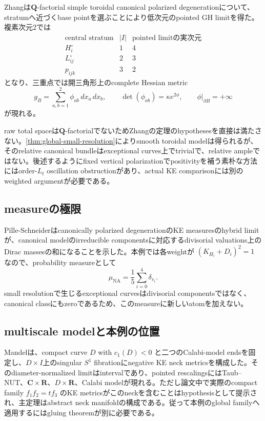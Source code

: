 \documentclass[11pt,a4paper]{ltjsarticle}
\theoremstyle{definition}
\theoremstyle{remark}
\newcommand{\CC}{\mathbf C}
\newcommand{\RR}{\mathbf R}
\begin{document}
Zhangは$\mathbf Q$-factorial simple toroidal canonical polarized degenerationについて、stratumへ近づくbase pointを選ぶことにより低次元のpointed GH limitを得た\cite{Zhang}。複素次元2では
\[
 \begin{array}{c|c|c}
 \text{central stratum}&|I|&\text{pointed limitの実次元}\\
 \hline
 H_i^\circ&1&4\\
 L_{ij}^\circ&2&3\\
 p_{ijk}&3&2
 \end{array}
\]
となり、三重点では開三角形上のcomplete Hessian metric
\begin{equation}\label{eq:CYsimplex}
 g_B=\sum_{a,b=1}^2\phi_{ab}\,dx_a\,dx_b,
 \qquad
 \det(\phi_{ab})=\kappa e^{2\phi},
 \qquad \phi|_{\partial B}=+\infty
\end{equation}
が現れる。

raw total spaceは$\mathbf Q$-factorialでないためZhangの定理のhypothesesを直接は満たさない。\cref{thm:global-small-resolution}によりsmooth toroidal modelは得られるが、そのrelative canonical bundleはexceptional curves上でtrivialで、relative ampleではない。後述するようにfixed vertical polarizationでpositivityを補う素朴な方法にはorder-$L_t$ oscillation obstructionがあり、actual KE comparisonには別のweighted argumentが必要である。

\subsection{measureの極限}

Pille-Schneiderはcanonically polarized degenerationのKE measuresのhybrid limitが、canonical modelのirreducible componentsに対応するdivisorial valuations上のDirac massesの和になることを示した\cite{PilleSchneider}。本例では各weightが $(K_{H_i}+D_i)^2=1$ なので、probability measureとして
\begin{equation}\label{eq:measurelimit}
 \mu_{\mathrm{NA}}=\frac15\sum_{i=0}^4\delta_{v_i}.
\end{equation}
small resolutionで生じるexceptional curvesはdivisorial componentsではなく、canonical classにもzeroであるため、このmeasureに新しいatomを加えない。

\subsection{multiscale modelと本例の位置}

Mandelは、compact curve $D$ with $c_1(D)<0$ と二つのCalabi-model endsを固定し、$D\times I$上のsingular $S^1$ fibrationにnegative KE neck metricsを構成した\cite{Mandel}。そのdiameter-normalized limitはintervalであり、pointed rescalingsにはTaub--NUT、$\CC\times\RR$、$D\times\RR$、Calabi modelが現れる。ただし論文中で実際のcompact family
$f_1f_2=tf_3$ のKE metricsがこのneckを含むことはhypothesisとして提示され、主定理はabstract neck manifoldの構成である。従って本例のglobal familyへ適用するにはgluing theoremが別に必要である。
\end{document}

